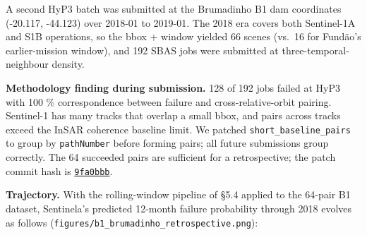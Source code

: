 \documentclass[
  11pt]{article}
\begin{document}
A second HyP3 batch was submitted at the Brumadinho B1 dam coordinates
(-20.117, -44.123) over 2018-01 to 2019-01. The 2018 era covers both
Sentinel-1A and S1B operations, so the bbox + window yielded 66 scenes
(vs.~16 for Fundão's earlier-mission window), and 192 SBAS jobs were
submitted at three-temporal-neighbour density.

\textbf{Methodology finding during submission.} 128 of 192 jobs failed
at HyP3 with 100 \% correspondence between failure and
cross-relative-orbit pairing. Sentinel-1 has many tracks that overlap a
small bbox, and pairs across tracks exceed the InSAR coherence baseline
limit. We patched \texttt{short\_baseline\_pairs} to group by
\texttt{pathNumber} before forming pairs; all future submissions group
correctly. The 64 succeeded pairs are sufficient for a retrospective;
the patch commit hash is
\href{https://github.com/ViktorSmirnov71/sentinela-bayes-br/commit/9fa0bbb}{\texttt{9fa0bbb}}.

\textbf{Trajectory.} With the rolling-window pipeline of §5.4 applied to
the 64-pair B1 dataset, Sentinela's predicted 12-month failure
probability through 2018 evolves as follows
(\texttt{figures/b1\_brumadinho\_retrospective.png}):
\end{document}

